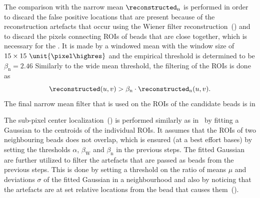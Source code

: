 The comparison with the narrow mean \(\reconstructed_{\text{n}}\) is performed in order to discard the false 
    positive locations that are present because of the reconstruction artefacts that occur using the Wiener filter
    reconstruction~() and to discard the pixels connecting \acp{ROI} of beads
    that are close together, which is necessary for the . %
It is made by a windowed mean with the window size of \(15\times 15~\unit{\pixel\highres}\) and the empirical threshold 
    is determined to be \(\beta_\text{n} = 2.46\)
Similarly to the wide mean threshold, the filtering of the \acp{ROI} is done as
    \begin{equation*}
    \reconstructed(u,v) > \beta_\text{n} \cdot \reconstructed_{\text{n}}(u,v).
    \end{equation*}
The final narrow mean filter that is used on the \acp{ROI} of the candidate beads is in 
\begin{marginfigure}[*-13]
    \caption{%
    In the wide mean, the \acp{ROI} of these beads remain connected.
    This is not desired for in the next step, where the centroids of the \acp{ROI} are used as initial locations of the 
        candidate beads for the Gaussian fit.
    A filter that has a narrow window size is efficient in reducing these connections.
    Another possibility would be to use the morphological operation of \emph{thinning} on the binary image
        after the wide mean filter to remove the connections.
}
\end{marginfigure}

The sub-pixel center localization~() is performed similarly as in~ by
    fitting a Gaussian to the centroids of the individual \acp{ROI}.
It assumes that the \acp{ROI} of two neighbouring beads does not overlap, which is ensured (at a best effort bases) by 
    setting the thresholds \(\alpha\), \(\beta_\text{W}\) and \(\beta_\text{n}\) in the previous steps.
The fitted Gaussian are further utilized to filter the artefacts that are passed as beads from the previous steps.
This is done by setting a threshold on the ratio of means \(\mu\) and deviations \(\sigma\) of the fitted Gaussian in
    a neighbourhood and also by noticing that the artefacts are at set relative locations from the bead that causes
    them~().

